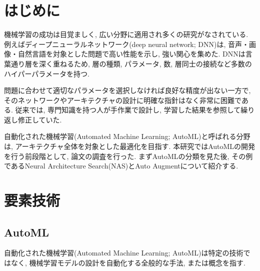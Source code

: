 \documentclass[twocolumn]{jarticle}     %
\begin{document}




\section{はじめに}

機械学習の成功は目覚ましく, 広い分野に適用され多くの研究がなされている.
例えばディープニューラルネットワーク(deep neural network; DNN)は, 音声・画像・自然言語を対象とした問題で高い性能を示し, 強い関心を集めた.
DNNは言葉通り層を深く重ねるため, 層の種類, パラメータ, 数, 層同士の接続など多数のハイパーパラメータを持つ.

問題に合わせて適切なパラメータを選択しなければ良好な精度が出ない一方で, そのネットワークやアーキテクチャの設計に明確な指針はなく非常に困難である. 従来では, 専門知識を持つ人が手作業で設計し, 学習した結果を参照して繰り返し修正していた.


自動化された機械学習(Automated Machine Learning; AutoML)と呼ばれる分野は, アーキテクチャ全体を対象とした最適化を目指す.
本研究ではAutoMLの開発を行う前段階として, 論文の調査を行った. まずAutoMLの分類を見た後, その例であるNeural Architecture Search(NAS)とAuto Augmentについて紹介する.

\section{要素技術}
\subsection{AutoML}
自動化された機械学習(Automated Machine Learning; AutoML)は特定の技術ではなく, 機械学習モデルの設計を自動化する全般的な手法, または概念を指す.
\end{document}
